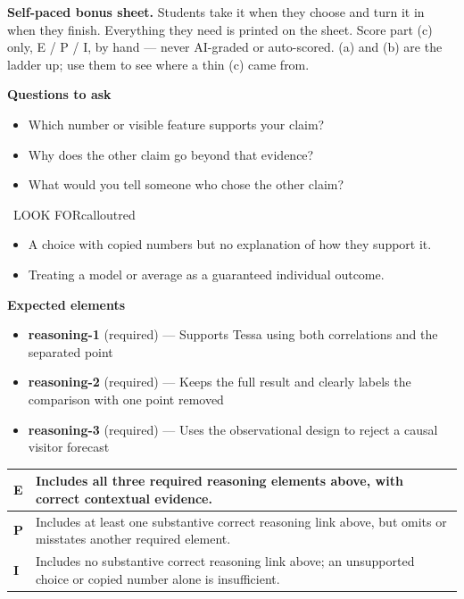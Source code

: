 \documentclass[11pt]{article}
\begin{document}
\textbf{Self-paced bonus sheet.} Students take it when they choose and turn it in when they finish. Everything they need is printed on the sheet. Score part (c) only, E / P / I, by hand --- never AI-graded or auto-scored. (a) and (b) are the ladder up; use them to see where a thin (c) came from.\par

\textbf{Questions to ask}
\begin{itemize}[leftmargin=1.5em,itemsep=2pt,topsep=2pt]
  \item Which number or visible feature supports your claim?
  \item Why does the other claim go beyond that evidence?
  \item What would you tell someone who chose the other claim?
\end{itemize}

\begin{callout}{\IconWarn\ LOOK FOR}{calloutred}
\begin{itemize}[leftmargin=1.5em,itemsep=2pt,topsep=2pt]
  \item A choice with copied numbers but no explanation of how they support it.
  \item Treating a model or average as a guaranteed individual outcome.
\end{itemize}
\end{callout}


\textbf{Expected elements}
\begin{itemize}[leftmargin=1.5em,itemsep=2pt,topsep=2pt]
  \item \textbf{reasoning-1} (required) --- Supports Tessa using both correlations and the separated point
  \item \textbf{reasoning-2} (required) --- Keeps the full result and clearly labels the comparison with one point removed
  \item \textbf{reasoning-3} (required) --- Uses the observational design to reject a causal visitor forecast
\end{itemize}

{\small\renewcommand{\arraystretch}{1.25}
\noindent\begin{tabular}{|p{0.5in}|p{5.9in}|}
\hline
\textbf{E} & Includes all three required reasoning elements above, with correct contextual evidence. \\ \hline
\textbf{P} & Includes at least one substantive correct reasoning link above, but omits or misstates another required element. \\ \hline
\textbf{I} & Includes no substantive correct reasoning link above; an unsupported choice or copied number alone is insufficient. \\ \hline
\end{tabular}}
\end{document}
